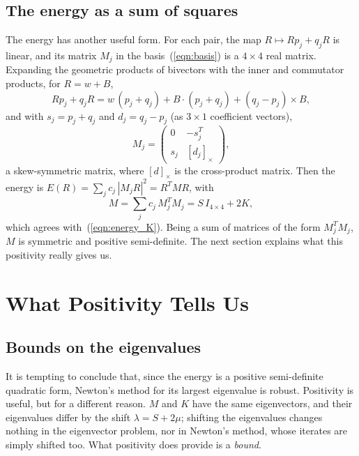 \documentclass{birkjour}
\theoremstyle{definition}
\theoremstyle{remark}
\numberwithin{equation}{section}
\begin{document}
\subsection{The energy as a sum of squares}

The energy has another useful form. For each pair, the map $R \mapsto R p_j + q_j R$ is linear, and its matrix $M_j$ in the basis~(\ref{eqn:basis}) is a $4 \times 4$ real matrix. Expanding the geometric products of bivectors with the inner and commutator products, for $R = w + B$,
\begin{equation*}
R p_j + q_j R = w\, (p_j + q_j) + B \cdot (p_j + q_j) + (q_j - p_j) \times B,
\end{equation*}
and with $s_j = p_j + q_j$ and $d_j = q_j - p_j$ (as $3 \times 1$ coefficient vectors),
\begin{equation}
\label{eqn:Mj}
M_j = \begin{pmatrix} 0 & -s_j^T \\ s_j & [d_j]_\times \end{pmatrix},
\end{equation}
a skew-symmetric matrix, where $[d]_\times$ is the cross-product matrix. Then the energy is $E(R) = \sum_j c_j\, |M_j R|^2 = R^T M R$, with
\begin{equation}
\label{eqn:M}
M = \sum_j c_j\, M_j^T M_j = S\, I_{4\times4} + 2 K,
\end{equation}
which agrees with~(\ref{eqn:energy_K}). Being a sum of matrices of the form $M_j^T M_j$, $M$ is symmetric and positive semi-definite. The next section explains what this positivity really gives us.

\section{What Positivity Tells Us}
\label{section:positivity}

\subsection{Bounds on the eigenvalues}

It is tempting to conclude that, since the energy is a positive semi-definite quadratic form, Newton's method for its largest eigenvalue is robust. Positivity is useful, but for a different reason. $M$ and $K$ have the same eigenvectors, and their eigenvalues differ by the shift $\lambda = S + 2\mu$; shifting the eigenvalues changes nothing in the eigenvector problem, nor in Newton's method, whose iterates are simply shifted too. What positivity does provide is a \emph{bound}.
\end{document}
